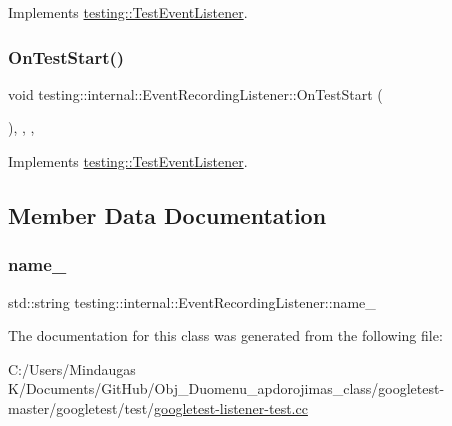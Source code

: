 Implements \mbox{\hyperlink{classtesting_1_1_test_event_listener_ab4f6a0ca16ae75daf385b3b5914e1048}{testing\+::\+Test\+Event\+Listener}}.

\mbox{\label{classtesting_1_1internal_1_1_event_recording_listener_ad850af9e4276b9bfba61435b97a02094}} 
\subsubsection{\texorpdfstring{OnTestStart()}{OnTestStart()}\hspace{0.1cm}{\footnotesize\ttfamily [3/3]}}
{\footnotesize\ttfamily void testing\+::internal\+::\+Event\+Recording\+Listener\+::\+On\+Test\+Start (\begin{DoxyParamCaption}\item[{const \mbox{\hyperlink{classtesting_1_1_test_info}{Test\+Info}} \&}]{ }\end{DoxyParamCaption})\hspace{0.3cm}{\ttfamily [inline]}, {\ttfamily [override]}, {\ttfamily [protected]}, {\ttfamily [virtual]}}



Implements \mbox{\hyperlink{classtesting_1_1_test_event_listener_ab4f6a0ca16ae75daf385b3b5914e1048}{testing\+::\+Test\+Event\+Listener}}.



\subsection{Member Data Documentation}
\mbox{\label{classtesting_1_1internal_1_1_event_recording_listener_ad65961b8f32b63cffd46c8820256a88f}} 
\subsubsection{\texorpdfstring{name\_}{name\_}}
{\footnotesize\ttfamily std\+::string testing\+::internal\+::\+Event\+Recording\+Listener\+::name\+\_\+\hspace{0.3cm}{\ttfamily [private]}}



The documentation for this class was generated from the following file\+:\begin{DoxyCompactItemize}
\item 
C\+:/\+Users/\+Mindaugas K/\+Documents/\+Git\+Hub/\+Obj\+\_\+\+Duomenu\+\_\+apdorojimas\+\_\+class/googletest-\/master/googletest/test/\mbox{\hyperlink{googletest-master_2googletest_2test_2googletest-listener-test_8cc}{googletest-\/listener-\/test.\+cc}}\end{DoxyCompactItemize}
